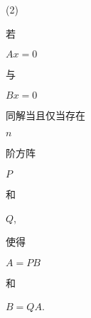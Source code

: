 \documentclass[10pt]{article}
\begin{document}
(2) \begin{CJK}{UTF8}{mj}若\end{CJK} $A x=0$ \begin{CJK}{UTF8}{mj}与\end{CJK} $B x=0$ \begin{CJK}{UTF8}{mj}同解当且仅当存在\end{CJK} $n$ \begin{CJK}{UTF8}{mj}阶方阵\end{CJK} $P$ \begin{CJK}{UTF8}{mj}和\end{CJK} $Q$, \begin{CJK}{UTF8}{mj}使得\end{CJK} $A=P B$ \begin{CJK}{UTF8}{mj}和\end{CJK} $B=Q A$.
\end{document}
